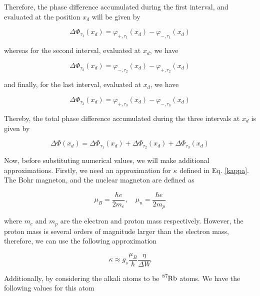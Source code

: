 \documentclass{article}
\begin{document}
Therefore, the phase difference accumulated during the first interval, and evaluated at the position $x_{d}$ will be given by

\begin{equation}
\Delta \Phi_{\tau_{1}}(x_{d}) = \varphi_{+,\tau_{1}}(x_{d}) - \varphi_{-,\tau_{1}}(x_{d})
\end{equation}

whereas for the second interval, evaluated at $x_{d}$, we have

\begin{equation}
\Delta \Phi_{\tau_{2}}(x_{d}) = \varphi_{-,\tau_{2}}(x_{d}) - \varphi_{+,\tau_{2}}(x_{d})
\end{equation}

and finally, for the last interval, evaluated at $x_{d}$, we have

\begin{equation}
\Delta \Phi_{\tau_{3}}(x_{d}) = \varphi_{+,\tau_{3}}(x_{d}) - \varphi_{-,\tau_{3}}(x_{d})
\end{equation}

Thereby, the total phase difference accumulated during the three intervals at $x_{d}$ is given by 

\begin{equation}\label{pre_total_quantum_phase}
\Delta \Phi (x_{d}) = \Delta \Phi_{\tau_{1}}(x_{d}) + \Delta \Phi_{\tau_{2}}(x_{d}) + \Delta \Phi_{\tau_{3}}(x_{d})
\end{equation}

Now, before substituting numerical values, we will make additional approximations. Firstly, we need an approximation for $\kappa$ defined in Eq. \ref{kappa}. The Bohr magneton, and the nuclear magneton are defined as

\begin{equation}
\mu_{B} = \frac{\hbar e}{2 m_{e}} \mathrm{,}\quad \mu_{n} = \frac{\hbar e}{2 m_{p}}
\end{equation}

where $m_{e}$ and $m_{p}$ are the electron and proton mass respectively. However, the proton mass is several orders of magnitude larger than the electron mass, therefore, we can use the following approximation

\begin{equation}\label{kappa_approx}
\kappa \approx g_{s}\frac{\mu_{B}}{\hbar} \frac{\eta}{\Delta W}
\end{equation}

Additionally, by considering the alkali atoms to be $\ce{^{87}_{}Rb}$ atoms. We have the following values for this atom \cite{KAUSHALSK1970,Bunge1993} 
\end{document}
